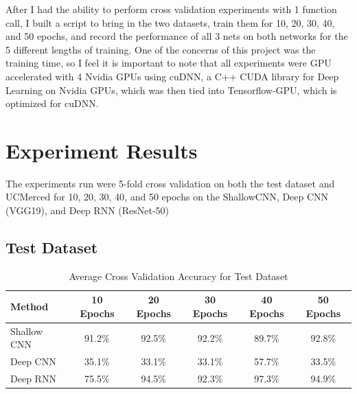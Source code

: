 \documentclass[12pt]{article}
\begin{document}
After I had the ability to perform cross validation experiments with 1 function call, I built a script to bring in the two datasets, train them for 10, 20, 30, 40, and 50 epochs, and record the performance of all 3 nets on both networks for the 5 different lengths of training. One of the concerns of this project was the training time, so I feel it is important to note that all experiments were GPU accelerated with 4 Nvidia GPUs using cuDNN, a C++ CUDA library for Deep Learning on Nvidia GPUs, which was then tied into Tensorflow-GPU, which is optimized for cuDNN. 
	
	\section{Experiment Results}
	
	The experiments run were 5-fold cross validation on  both the test dataset and UCMerced for 10, 20, 30, 40, and 50 epochs on the ShallowCNN, Deep CNN (VGG19), and Deep RNN (ResNet-50)
	\subsection{Test Dataset}

	\begin{table}[h!]
		\begin{center}
			\caption{Average Cross Validation Accuracy for Test Dataset}
			\label{table:test}
			\begin{tabular}{l | S | S | S | S |  S}
				\textbf{Method} & \textbf{10 Epochs} & \textbf{20 Epochs} & \textbf{30 Epochs} & \textbf{40 Epochs} & \textbf{50 Epochs} \\
				\hline
				Shallow CNN & 91.2\% & 92.5\% & 92.2\% & 89.7\% & 92.8\% \\
				Deep CNN & 35.1\% & 33.1\% & 33.1\% & 57.7\% & 33.5\% \\
				Deep RNN & 75.5\% & 94.5\% & 92.3\% & 97.3\% & 94.9\% \\
				
			
			\end{tabular}					
		
		
		\end{center}
	
	\end{table}
\end{document}
